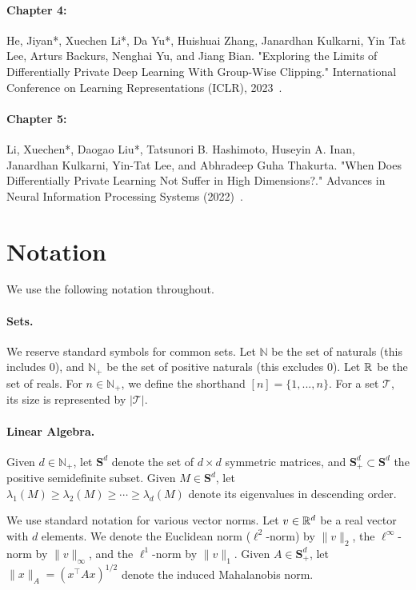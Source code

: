 \paragraph{Chapter 4:}
He, Jiyan*, Xuechen Li*, Da Yu*, Huishuai Zhang, Janardhan Kulkarni, Yin Tat Lee, Arturs Backurs, Nenghai Yu, and Jiang Bian. "Exploring the Limits of Differentially Private Deep Learning With Group-Wise Clipping." International Conference on Learning Representations (ICLR), 2023~\cite{he2022exploring}.

\paragraph{Chapter 5:}
Li, Xuechen*, Daogao Liu*, Tatsunori B. Hashimoto, Huseyin A. Inan, Janardhan Kulkarni, Yin-Tat Lee, and Abhradeep Guha Thakurta. "When Does Differentially Private Learning Not Suffer in High Dimensions?." Advances in Neural Information Processing Systems (2022)~\cite{li2022does}.

\newpage
\section*{Notation}
We use the following notation throughout.

\paragraph{Sets.} 
We reserve standard symbols for common sets.
Let $\mathbb{N}$ be the set of naturals (this includes 0), and $\mathbb{N}_+$ be the set of positive naturals (this excludes 0).
Let $\mathbb{R}$ be the set of reals.
For $n \in \mathbb{N}_+$, we define the shorthand $[n] = \{1, . . . , n\}$.
For a set $\mathcal{T}$, its size is represented by $|\mathcal{T}|$.

\paragraph{Linear Algebra.}
Given $d \in \mathbb{N}_+$, 
let $\mathbf{S}^d$ denote the set of $d \times d$ symmetric matrices, and $\mathbf{S}^d_+ \subset \mathbf{S}^d$ the positive semidefinite subset. 
Given $M \in \mathbf{S}^d$, let $\lambda_1(M) \ge \lambda_2(M) \ge \cdots \ge \lambda_d(M)$ denote its eigenvalues in descending order.

We use standard notation for various vector norms.
Let $v\in \mathbb{R}^d$ be a real vector with $d$ elements. 
We denote the Euclidean norm ($\ell^2$-norm) by $\|v\|_2$, 
the $\ell^\infty$-norm by $\|v\|_\infty$, and the $\ell^1$-norm by $\|v\|_1$.
Given $A \in \mathbf{S}^d_+$, let $\| x \|_A = (x^\top A x)^{1/2}$ denote the induced Mahalanobis norm.

